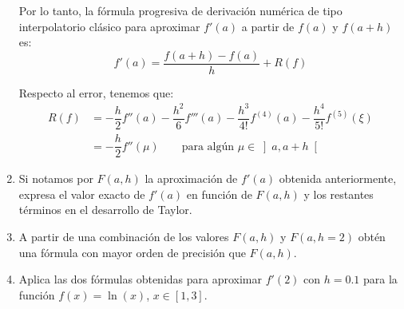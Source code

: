 \begin{ejercicio}
\begin{enumerate}
        Por lo tanto, la fórmula progresiva de derivación numérica de tipo interpolatorio clásico para aproximar $f'(a)$ a partir de $f(a)$ y $f(a + h)$ es:
        \begin{equation*}
            f'(a) = \dfrac{f(a + h) - f(a)}{h} + R(f)
        \end{equation*}

        Respecto al error, tenemos que:
        \begin{align*}
            R(f) &= -\dfrac{h}{2}f''(a) -\dfrac{h^2}{6}f'''(a) -\dfrac{h^3}{4!}f^{(4)}(a) - \dfrac{h^4}{5!}f^{(5)}(\xi) \\
            &= -\dfrac{h}{2}f''(\mu)\qquad \text{para algún }\mu\in\left]a,a+h\right[
        \end{align*}



        
        \item Si notamos por $F(a, h)$ la aproximación de $f'(a)$ obtenida anteriormente, expresa el valor exacto de $f'(a)$ en función de $F(a, h)$ y los restantes términos en el desarrollo de Taylor.
        
        \item A partir de una combinación de los valores $F(a, h)$ y $F(a, h = 2)$ obtén una fórmula con mayor orden de precisión que $F(a, h)$.
        
        \item Aplica las dos fórmulas obtenidas para aproximar $f'(2)$ con $h = 0.1$ para la función $f(x) = \ln(x)$, $x \in [1, 3]$.
    \end{enumerate}
\end{ejercicio}

